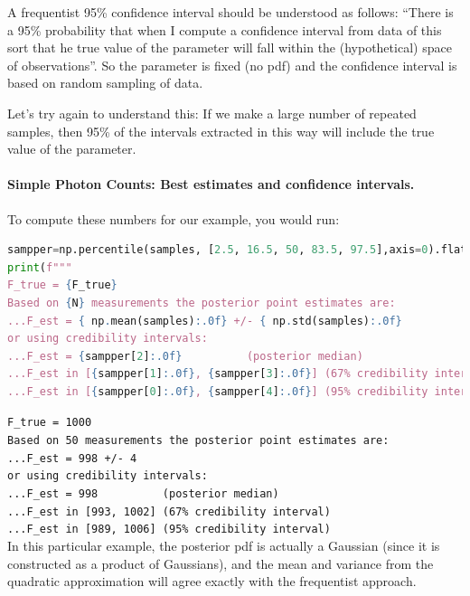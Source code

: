 \documentclass[%
oneside,                 %
final,                   %
10pt]{article}
\newenvironment{block_mdfboxadmon}[1][]{
\begin{block_mdfboxmdframed}[frametitle=#1]
}
{
\end{block_mdfboxmdframed}
}
\begin{document}

\begin{block_mdfboxadmon}[]
A frequentist 95\% confidence interval should be understood as follows: 
``There is a 95\% probability that when I compute a confidence interval from data of this sort that he true value of the parameter will fall within the (hypothetical) space of observations''. So the parameter is fixed (no pdf) and the confidence interval is based on random sampling of data. 

Let's try again to understand this: If we make a large number of repeated samples, then 95\% of the intervals extracted in this way will include the true value of the parameter.
\end{block_mdfboxadmon} %




\paragraph{Simple Photon Counts: Best estimates and confidence intervals.}
To compute these numbers for our example, you would run:

\begin{lstlisting}[language=Python,style=blue1]
sampper=np.percentile(samples, [2.5, 16.5, 50, 83.5, 97.5],axis=0).flatten()
print(f"""
F_true = {F_true}
Based on {N} measurements the posterior point estimates are:
...F_est = { np.mean(samples):.0f} +/- { np.std(samples):.0f}
or using credibility intervals:
...F_est = {sampper[2]:.0f}          (posterior median) 
...F_est in [{sampper[1]:.0f}, {sampper[3]:.0f}] (67% credibility interval) 
...F_est in [{sampper[0]:.0f}, {sampper[4]:.0f}] (95% credibility interval) """)
\end{lstlisting}
\Verb!F_true = 1000! \\
\texttt{Based on 50 measurements the posterior point estimates are:} \\
\Verb!...F_est = 998 +/- 4! \\
\texttt{or using credibility intervals:} \\
\Verb!...F_est = 998          (posterior median)!  \\
\Verb!...F_est in [993, 1002] (67% credibility interval)!  \\
\Verb!...F_est in [989, 1006] (95% credibility interval)!  \\

In this particular example, the posterior pdf is actually a Gaussian (since it is constructed as a product of Gaussians), and the mean and variance from the quadratic approximation will agree exactly with the frequentist approach.
\end{document}
